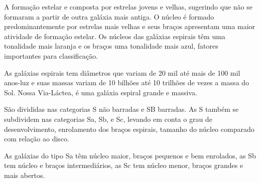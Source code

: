 A formação estelar e composta por estrelas jovens e velhas, sugerindo que não se formaram a partir de outra galáxia mais antiga. O núcleo é formado predominantemente por estrelas mais velhas e seus braços apresentam uma maior atividade de formação estelar. Os núcleos das galáxias espirais têm uma tonalidade mais laranja e os braços uma tonalidade mais azul, fatores importantes para classificação. 

As galáxias espirais tem diâmetros que variam de 20 mil até mais de 100 mil anos-luz e suas massas variam de 10 bilhões até 10 trilhões de vezes a massa do Sol. Nossa Via-Láctea, é uma galáxia espiral grande e massiva. 

São divididas nas categorias S não barradas e SB barradas. As S também se subdividem nas categorias Sa, Sb, e Sc, levando em conta o grau de desenvolvimento, enrolamento dos braços espirais, tamanho do núcleo comparado com relação ao disco. 

As galáxias do tipo Sa têm núcleo maior, braços pequenos e bem enrolados, as Sb tem núcleo e braços intermediários, as Sc tem núcleo menor, braços grandes e mais abertos.  

